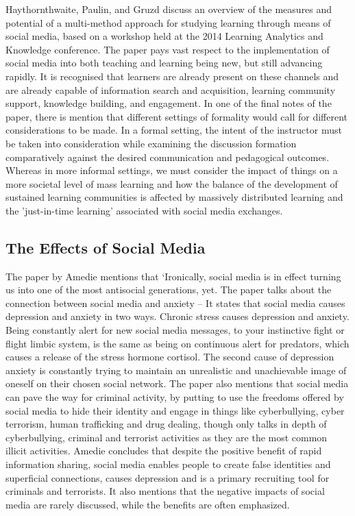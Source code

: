 \documentclass[lettersize,journal]{IEEEtran}
\begin{document}
    Haythornthwaite, Paulin, and Gruzd \cite{Haythornthwaite et al 2016}  discuss
    an overview of the measures and potential of a multi-method approach for studying learning
    through means of social media, based on a workshop held at the 2014 Learning
    Analytics and Knowledge conference. The paper pays vast respect to the
    implementation of social media into both teaching and learning being new,
    but still advancing rapidly. It is recognised that learners are already
    present on these channels and are already capable of information search and
    acquisition, learning community support, knowledge building, and engagement.
    In one of the final notes of the paper, there is mention that different
    settings of formality would call for different considerations to be made. In
    a formal setting, the intent of the instructor must be taken into
    consideration while examining the discussion formation comparatively against
    the desired communication and pedagogical outcomes. Whereas in more informal
    settings, we must consider the impact of things on a more societal level of
    mass learning and how the balance of the development of sustained learning
    communities is affected by massively distributed learning and the
    'just-in-time learning' associated with social media exchanges.

\subsection{The Effects of Social Media}
    The paper by Amedie \cite{Amedie 2015} mentions that ‘Ironically, social
    media is in effect turning us into one of the most antisocial generations,
    yet. The paper talks about the connection between social media and anxiety
    – It states that social media causes depression and anxiety in two ways. Chronic
    stress causes depression and anxiety. Being constantly alert for new social
    media messages, to your instinctive fight or flight limbic system, is the
    same as being on continuous alert for predators, which causes a release of
    the stress hormone cortisol. The second cause of depression anxiety is
    constantly trying to maintain an unrealistic and unachievable image of
    oneself on their chosen social network. The paper also mentions
    that social media can pave the way for criminal activity, by putting to use
    the freedoms offered by social media to hide their identity and engage in
    things like cyberbullying, cyber terrorism, human trafficking and drug dealing,
    though only talks in depth of cyberbullying, criminal and terrorist activities
    as they are the most common illicit activities. Amedie concludes that despite
    the positive benefit of rapid information sharing, social media enables people
    to create false identities and superficial connections, causes depression and
    is a primary recruiting tool for criminals and terrorists. It also mentions
    that the negative impacts of social media are rarely discussed, while the benefits
    are often emphasized.
\end{document}
